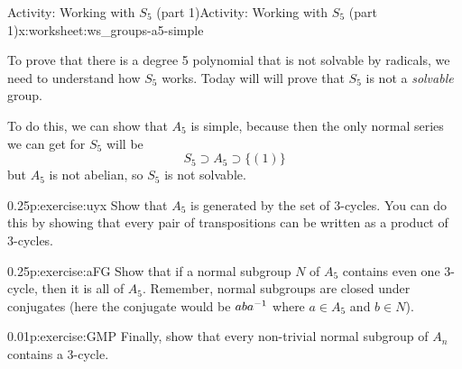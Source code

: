\documentclass[11pt]{book}
\begin{document}
%
%
\typeout{************************************************}
\typeout{************************************************}
%
\begin{worksheet-subsection}{Activity: Working with \(S_5\) (part 1)}{}{Activity: Working with \(S_5\) (part 1)}{}{}{x:worksheet:ws_groups-a5-simple}
\begin{introduction}{}%
To prove that there is a degree 5 polynomial that is not solvable by radicals, we need to understand how \(S_5\) works.  Today will will prove that \(S_5\) is not a \emph{solvable} group.%
\par
To do this, we can show that \(A_5\) is simple, because then the only normal series we can get for \(S_5\) will be%
\begin{equation*}
S_5 \supset A_5 \supset \{(1)\}
\end{equation*}
but \(A_5\) is not abelian, so \(S_5\) is not solvable.%
\end{introduction}%
\begin{divisionexercise}{1}{}{0.25}{p:exercise:uyx}%
Show that \(A_5\) is generated by the set of 3-cycles.  You can do this by showing that every pair of transpositions can be written as a product of 3-cycles.%
\end{divisionexercise}%
\begin{divisionexercise}{2}{}{0.25}{p:exercise:aFG}%
Show that if a normal subgroup \(N\) of \(A_5\) contains even one 3-cycle, then it is all of \(A_5\).  Remember, normal subgroups are closed under conjugates (here the conjugate would be \(aba^{-1}\) where \(a \in A_5\) and \(b \in N\)).%
\end{divisionexercise}%
\begin{divisionexercise}{3}{}{0.01}{p:exercise:GMP}%
Finally, show that every non-trivial normal subgroup of \(A_n\) contains a 3-cycle.%
\end{divisionexercise}%
\end{worksheet-subsection}
\restoregeometry
\end{document}
